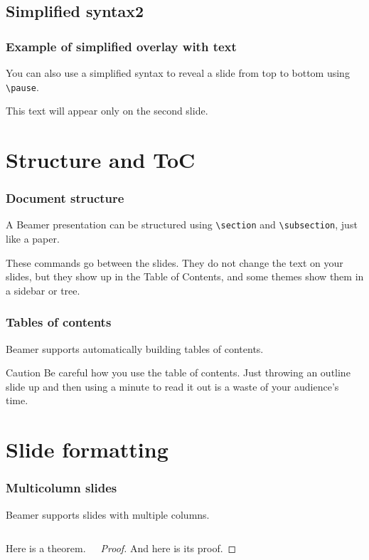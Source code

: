 \subsection{Simplified syntax2}
\begin{frame}[fragile]
  \frametitle{Example of simplified overlay with text}
  You can also use a simplified syntax to reveal a slide from top to bottom using \verb|\pause|.

  \pause

  This text will appear only on the second slide.
\end{frame}

\section{Structure and ToC}
\begin{frame}[fragile]
  \frametitle{Document structure}
  A Beamer presentation can be structured using \verb|\section| and \verb|\subsection|, just like a paper.

  These commands go \alert{between} the slides.
  They do not change the text on your slides, but they show up in the Table of Contents, and some themes show them in a sidebar or tree.
\end{frame}

\begin{frame}
  \frametitle{Tables of contents}
  Beamer supports automatically building tables of contents.

  \begin{alertblock}{Caution}
    Be careful how you use the table of contents.
    Just throwing an outline slide up and then using a minute to read it out is a waste of your audience's time.
  \end{alertblock}
\end{frame}

\section{Slide formatting}
\begin{frame}
  \frametitle{Multicolumn slides}
  Beamer supports slides with multiple columns.

  \begin{columns}
    \begin{theorem}
      Here is a theorem.
    \end{theorem}

    \begin{proof}
      And here is its proof.
    \end{proof}
  \end{columns}
\end{frame}

